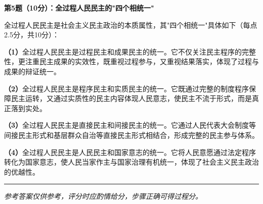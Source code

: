 \documentclass[12pt, a4paper]{article}
\newcommand{\examrule}{\noindent\rule{\linewidth}{0.6pt}}
\begin{document}
\begin{answerbox}

\textbf{第5题（10分）：全过程人民民主的"四个相统一"}

全过程人民民主是社会主义民主政治的本质属性，其"四个相统一"具体如下（每点2.5分，共10分）：

\textbf{（1）}全过程人民民主是过程民主和成果民主的统一。它不仅关注民主程序的完整性，更注重民主成果的实效性，既重视过程参与，又重视结果落实，体现了过程与成果的辩证统一。

\textbf{（2）}全过程人民民主是程序民主和实质民主的统一。它既通过完整的制度程序保障民主运转，又通过实质性的民主内容体现人民意志，使民主不流于形式，而是真正落到实处。

\textbf{（3）}全过程人民民主是直接民主和间接民主的统一。它通过人民代表大会制度等间接民主形式和基层群众自治等直接民主形式相结合，形成完整的民主参与体系。

\textbf{（4）}全过程人民民主是人民民主和国家意志的统一。它将人民意愿通过法定程序转化为国家意志，使人民当家作主与国家治理有机统一，体现了社会主义民主政治的优越性。

\end{answerbox}

\vspace{12pt}
\examrule
\begin{center}
  \textit{参考答案仅供参考，评分时应酌情给分，步骤正确可得过程分。}

\end{center}
\end{document}
